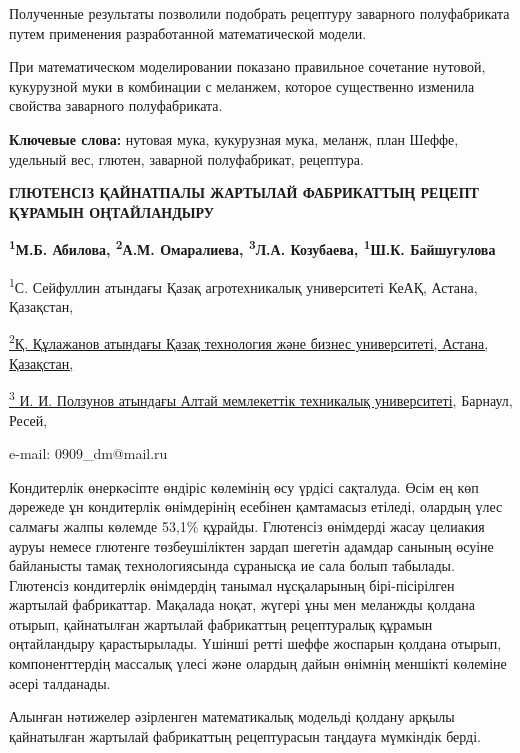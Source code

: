 Полученные результаты позволили подобрать рецептуру заварного
полуфабриката путем применения разработанной математической модели.

При математическом моделировании показано правильное сочетание нутовой,
кукурузной муки в комбинации с меланжем, которое существенно изменила
свойства заварного полуфабриката.

{\bfseries Ключевые слова:} нутовая мука, кукурузная мука, меланж, план
Шеффе, удельный вес, глютен, заварной полуфабрикат, рецептура.

\begin{articleheader}
{\bfseries ГЛЮТЕНСІЗ ҚАЙНАТПАЛЫ ЖАРТЫЛАЙ ФАБРИКАТТЫҢ РЕЦЕПТ ҚҰРАМЫН
ОҢТАЙЛАНДЫРУ}

{\bfseries \textsuperscript{1}М.Б. Абилова\textsuperscript{\envelope },
\textsuperscript{2}А.М. Омаралиева, \textsuperscript{3}Л.А. Козубаева,
\textsuperscript{1}Ш.К. Байшугулова}
\end{articleheader}

\begin{affiliation}
\textsuperscript{1}С. Сейфуллин атындағы Қазақ агротехникалық
университеті КеАҚ, Астана, Қазақстан,

\href{https://bankchart.kz/spravochniki/pochtovyye_indeksy/id/116470}{\textsuperscript{2}Қ.
Құлажанов атындағы Қазақ технология және бизнес университеті, Астана,
Қазақстан,}

\href{https://bankchart.kz/spravochniki/pochtovyye_indeksy/id/116470}{\textsuperscript{3}
И. И. Ползунов атындағы Алтай мемлекеттік техникалық университеті},
Барнаул, Ресей,

e-mail: 0909\_dm@mail.ru
\end{affiliation}

Кондитерлік өнеркәсіпте өндіріс көлемінің өсу үрдісі сақталуда. Өсім ең
көп дәрежеде ұн кондитерлік өнімдерінің есебінен қамтамасыз етіледі,
олардың үлес салмағы жалпы көлемде 53,1\% құрайды. Глютенсіз өнімдерді
жасау целиакия ауруы немесе глютенге төзбеушіліктен зардап шегетін
адамдар санының өсуіне байланысты тамақ технологиясында сұранысқа ие
сала болып табылады. Глютенсіз кондитерлік өнімдердің танымал
нұсқаларының бірі-пісірілген жартылай фабрикаттар. Мақалада ноқат,
жүгері ұны мен меланжды қолдана отырып, қайнатылған жартылай фабрикаттың
рецептуралық құрамын оңтайландыру қарастырылады. Үшінші ретті шеффе
жоспарын қолдана отырып, компоненттердің массалық үлесі және олардың
дайын өнімнің меншікті көлеміне әсері талданады.

Алынған нәтижелер әзірленген математикалық модельді қолдану арқылы
қайнатылған жартылай фабрикаттың рецептурасын таңдауға мүмкіндік берді.

